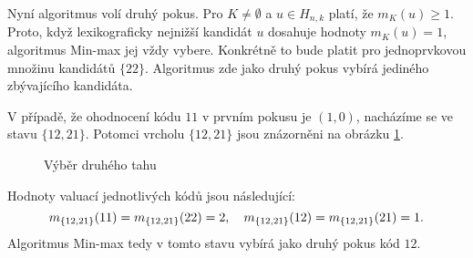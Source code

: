Nyní algoritmus volí druhý pokus. Pro $K \neq \emptyset$ a $u \in H_{n,k}$ platí, že $m_K(u) \geq 1$. Proto, když lexikograficky nejnižší kandidát $u$ dosahuje hodnoty $m_K(u) = 1$, algoritmus Min-max jej vždy vybere. Konkrétně to bude platit pro jednoprvkovou množinu kandidátů $\{22\}$. Algoritmus zde jako druhý pokus vybírá jediného zbývajícího kandidáta. 

V případě, že ohodnocení kódu $11$ v prvním pokusu je $(1,0)$, nacházíme se ve stavu $\{12,21\}$. Potomci vrcholu $\{12,21\}$ jsou znázorněni na obrázku \ref{fig22druhytah}. 
\begin{figure}[h!]
    \centering
    \caption{Výběr druhého tahu}
\label{fig22druhytah}
\end{figure}
Hodnoty valuací jednotlivých kódů jsou následující:
\[m_{\{12,21\}} (11) = m_{\{12,21\}} (22) = 2, \hspace{10px} m_{\{12,21\}} (12) = m_{\{12,21\}} (21) = 1.\]
Algoritmus Min-max tedy v tomto stavu vybírá jako druhý pokus kód $12$. 

